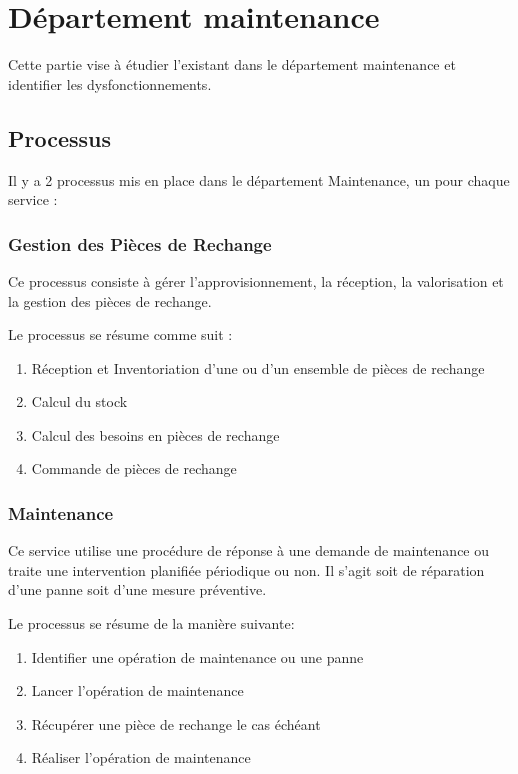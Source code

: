 \section{Département maintenance}

Cette partie vise à étudier l'existant dans le département maintenance et
identifier les dysfonctionnements.

\subsection{Processus}
Il y a 2 processus mis en place dans le département Maintenance, un pour 
chaque service :

\subsubsection{Gestion des Pièces de Rechange}

Ce processus consiste à gérer l'approvisionnement, la réception, la 
valorisation et la gestion des pièces de rechange.

Le processus se résume comme suit :

\begin{enumerate}
\item Réception et Inventoriation d'une ou d'un ensemble de pièces de
        rechange
\item Calcul du stock
\item Calcul des besoins en pièces de rechange
\item Commande de pièces de rechange
\end{enumerate}

\subsubsection{Maintenance}
Ce service utilise une procédure de réponse à une demande de maintenance ou
traite une intervention planifiée périodique ou non. Il s'agit soit de 
réparation d'une panne soit d'une mesure préventive.


Le processus se résume de la manière suivante:

\begin{enumerate}
\item Identifier une opération de maintenance ou une panne
\item Lancer l'opération de maintenance
\item Récupérer une pièce de rechange le cas échéant
\item Réaliser l'opération de maintenance
\end{enumerate}

